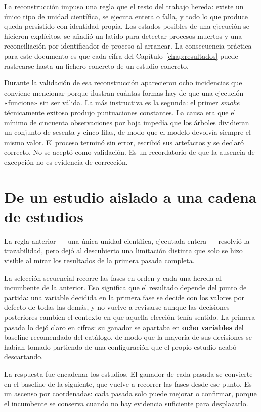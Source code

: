 La reconstrucción impuso una regla que el resto del trabajo hereda: existe un único tipo de unidad
científica, se ejecuta entera o falla, y todo lo que produce queda persistido con identidad propia.
Los estados posibles de una ejecución se hicieron explícitos, se añadió un latido para detectar
procesos muertos y una reconciliación por identificador de proceso al arrancar. La consecuencia
práctica para este documento es que cada cifra del Capítulo~\ref{chap:resultados} puede rastrearse
hasta un fichero concreto de un estudio concreto.

Durante la validación de esa reconstrucción aparecieron ocho incidencias que conviene mencionar
porque ilustran cuántas formas hay de que una ejecución «funcione» sin ser válida. La más
instructiva es la segunda: el primer \textit{smoke} técnicamente exitoso produjo puntuaciones
constantes. La causa era que el mínimo de cincuenta observaciones por hoja impedía que los árboles
dividieran un conjunto de sesenta y cinco filas, de modo que el modelo devolvía siempre el mismo
valor. El proceso terminó sin error, escribió sus artefactos y se declaró correcto. No se aceptó
como validación. Es un recordatorio de que la ausencia de excepción no es evidencia de corrección.

\section{De un estudio aislado a una cadena de estudios}
\label{sec:cadena-studies}

La regla anterior --- una única unidad científica, ejecutada entera --- resolvió la trazabilidad,
pero dejó al descubierto una limitación distinta que solo se hizo visible al mirar los resultados de
la primera pasada completa.

La selección secuencial recorre las fases en orden y cada una hereda al incumbente de la anterior.
Eso significa que el resultado depende del punto de partida: una variable decidida en la primera
fase se decide con los valores por defecto de todas las demás, y no vuelve a revisarse aunque las
decisiones posteriores cambien el contexto en que aquella elección tenía sentido. La primera pasada
lo dejó claro en cifras: su ganador se apartaba en \textbf{ocho variables} del baseline recomendado
del catálogo, de modo que la mayoría de sus decisiones se habían tomado partiendo de una
configuración que el propio estudio acabó descartando.

La respuesta fue encadenar los estudios. El ganador de cada pasada se convierte en el baseline de la
siguiente, que vuelve a recorrer las fases desde ese punto. Es un ascenso por coordenadas: cada
pasada solo puede mejorar o confirmar, porque el incumbente se conserva cuando no hay evidencia
suficiente para desplazarlo.

